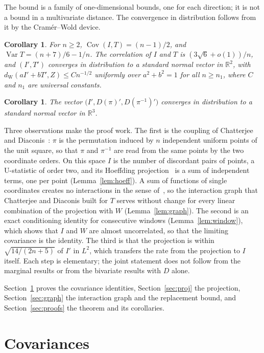 \documentclass[11pt]{amsart}
\newtheorem{corollary}[theorem]{Corollary}
\theoremstyle{remark}
\newcommand{\Var}{\operatorname{Var}}
\newcommand{\Cov}{\operatorname{Cov}}
\newcommand{\dW}{d_{\mathrm W}}
\begin{document}
The bound is a family of one-dimensional bounds, one for each direction; it is not a bound in a multivariate
distance. The convergence in distribution follows from it by the Cramér--Wold device.

\begin{corollary}\label{cor:T}
For $n\ge2$, $\Cov(I,T)=(n-1)/2$, and $\Var T=(n+7)/6-1/n$. The correlation of $I$ and $T$ is
$(3\sqrt6+o(1))/n$, and $(I',T')$ converges in distribution to a standard normal vector in $\mathbb R^2$, with
$\dW(aI'+bT',Z)\le Cn^{-1/2}$ uniformly over $a^2+b^2=1$ for all $n\ge n_1$, where $C$ and $n_1$ are universal constants.
\end{corollary}

\begin{corollary}\label{cor:triple}
The vector $\bigl(I',D(\pi)',D(\pi^{-1})'\bigr)$ converges in distribution to a standard normal vector in
$\mathbb R^3$.
\end{corollary}

Three observations make the proof work. The first is the coupling of Chatterjee and Diaconis~\cite{CD}: $\pi$ is the
permutation induced by $n$ independent uniform points of the unit square, so that $\pi$ and $\pi^{-1}$ are read from
the same points by the two coordinate orders. On this space $I$ is the number of discordant pairs of points, a
U-statistic of order two, and its Hoeffding projection~\cite{Hoeffding} is a sum of independent terms, one per point
(Lemma~\ref{lem:hoeff}). A sum of functions of single coordinates creates no interactions in the sense
of~\cite{Ch08}, so the interaction graph that Chatterjee and Diaconis built for $T$ serves without change for every
linear combination of the projection with $W$ (Lemma~\ref{lem:graph}). The second is an exact conditioning identity
for consecutive windows (Lemma~\ref{lem:window}), which shows that $I$ and $W$ are almost uncorrelated, so that the
limiting covariance is the identity. The third is that the projection is within $\sqrt{14/(2n+5)}$ of $I'$ in $L^2$, which
transfers the rate from the projection to $I$ itself. Each step is elementary; the joint statement does not follow from
the marginal results or from the bivariate results with $D$ alone.

Section~\ref{sec:moments} proves the covariance identities, Section~\ref{sec:proj} the projection,
Section~\ref{sec:graph} the interaction graph and the replacement bound, and Section~\ref{sec:proofs} the theorem and
its corollaries.

\section{Covariances}\label{sec:moments}
\end{document}
